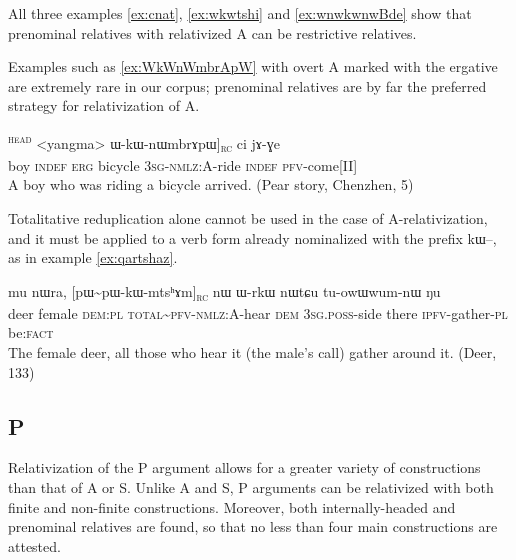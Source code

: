 \documentclass[oldfontcommands,oneside,a4paper,11pt]{article}
\newcommand{\ipa}[1]{{\phon #1}} %
\newcommand{\tete}{\textsuperscript{\textsc{head}}}
\newcommand{\rc}{\textsubscript{\textsc{rc}}}
\begin{document}
All three examples \ref{ex:cnat},  \ref{ex:wkwtshi} and \ref{ex:wnwkwnwBde} show that prenominal relatives with relativized A can be restrictive relatives.

Examples such as \ref{ex:WkWnWmbrApW} with overt A marked with the ergative are extremely rare in our corpus; prenominal relatives are by far the preferred strategy for relativization of A.
\begin{exe}
   \ex  \label{ex:WkWnWmbrApW}
\gll [[\ipa{tɤpɤtso}  	\ipa{ci}  	\ipa{kɯ}]\tete{}  	<yangma> 	\ipa{ɯ-kɯ-nɯmbrɤpɯ}]\rc{}  	\ipa{ci}  	\ipa{jɤ-ɣe}  \\
boy \textsc{indef} \textsc{erg} bicycle \textsc{3sg-nmlz:A}-ride \textsc{indef} \textsc{pfv}-come[II] \\
\glt A boy who was riding a bicycle arrived. (Pear story, Chenzhen, 5)
\end{exe}


Totalitative reduplication alone cannot be used in the case of A-relativization, and it must be applied to a verb form already nominalized with the prefix \ipa{kɯ}--, as in example \ref{ex:qartshaz}.

\begin{exe}
   \ex \label{ex:qartshaz}
   \gll \ipa{qartsʰaz}  	\ipa{mu}  	\ipa{nɯra,}  	[\ipa{pɯ\textasciitilde{}pɯ-kɯ-mtsʰɤm}]\rc{}  	\ipa{nɯ}  	\ipa{ɯ-rkɯ}  	\ipa{nɯtɕu}  	\ipa{tu-owɯwum-nɯ}  	\ipa{ŋu}  \\
   deer female \textsc{dem:pl} \textsc{total\textasciitilde{}pfv-nmlz:A}-hear \textsc{dem} \textsc{3sg.poss}-side there \textsc{ipfv}-gather-\textsc{pl} be:\textsc{fact} \\
\glt The female deer, all those who hear it (the male's call) gather around it. (Deer, 133)
\end{exe}


 
 
% 

\subsection{P} \label{sec:p.rel}
Relativization of the P argument allows for a greater variety of constructions than that of A or S. Unlike A and S, P arguments can be relativized with both finite and non-finite constructions. Moreover, both internally-headed and prenominal relatives are found, so that no less than four main constructions are attested. 
\end{document}
